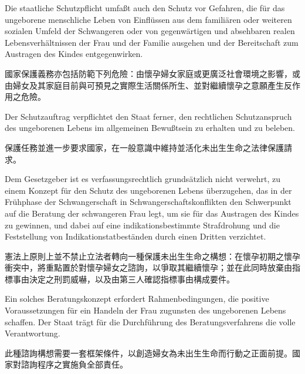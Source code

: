 \documentclass[12pt]{article}
\begin{document}
\syncleft
\begin{sourcepara}[title={原文要旨 9}]
Die staatliche Schutzpflicht umfaßt auch den Schutz vor Gefahren, die für das ungeborene menschliche Leben von Einflüssen aus dem familiären oder weiteren sozialen Umfeld der Schwangeren oder von gegenwärtigen und absehbaren realen Lebensverhältnissen der Frau und der Familie ausgehen und der Bereitschaft zum Austragen des Kindes entgegenwirken.
\end{sourcepara}
\begin{transpara}
國家保護義務亦包括防範下列危險：由懷孕婦女家庭或更廣泛社會環境之影響，或由婦女及其家庭目前與可預見之實際生活關係所生、並對繼續懷孕之意願產生反作用之危險。
\end{transpara}

\syncleft
\begin{sourcepara}[title={原文要旨 10}]
Der Schutzauftrag verpflichtet den Staat ferner, den rechtlichen Schutzanspruch des ungeborenen Lebens im allgemeinen Bewußtsein zu erhalten und zu beleben.
\end{sourcepara}
\begin{transpara}
保護任務並進一步要求國家，在一般意識中維持並活化未出生生命之法律保護請求。
\end{transpara}

\syncleft
\begin{sourcepara}[title={原文要旨 11}]
Dem Gesetzgeber ist es verfassungsrechtlich grundsätzlich nicht verwehrt, zu einem Konzept für den Schutz des ungeborenen Lebens überzugehen, das in der Frühphase der Schwangerschaft in Schwangerschaftskonflikten den Schwerpunkt auf die Beratung der schwangeren Frau legt, um sie für das Austragen des Kindes zu gewinnen, und dabei auf eine indikationsbestimmte Strafdrohung und die Feststellung von Indikationstatbeständen durch einen Dritten verzichtet.
\end{sourcepara}
\begin{transpara}
憲法上原則上並不禁止立法者轉向一種保護未出生生命之構想：在懷孕初期之懷孕衝突中，將重點置於對懷孕婦女之諮詢，以爭取其繼續懷孕；並在此同時放棄由指標事由決定之刑罰威嚇，以及由第三人確認指標事由構成要件。
\end{transpara}

\syncleft
\begin{sourcepara}[title={原文要旨 12}]
Ein solches Beratungskonzept erfordert Rahmenbedingungen, die positive Voraussetzungen für ein Handeln der Frau zugunsten des ungeborenen Lebens schaffen. Der Staat trägt für die Durchführung des Beratungsverfahrens die volle Verantwortung.
\end{sourcepara}
\begin{transpara}
此種諮詢構想需要一套框架條件，以創造婦女為未出生生命而行動之正面前提。國家對諮詢程序之實施負全部責任。
\end{transpara}
\end{document}
